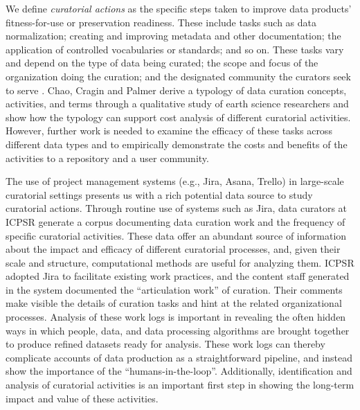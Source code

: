 \documentclass[conference]{IEEEtran}
\begin{document}
We define \textit{curatorial actions} as the specific steps taken to improve data products’ fitness-for-use or preservation readiness. These include tasks such as data normalization; creating and improving metadata and other documentation; the application of controlled vocabularies or standards; and so on. These tasks vary and depend on the type of data being curated; the scope and focus of the organization doing the curation; and the designated community the curators seek to serve \cite{Pienta2010-bl, Daniels2012-pj, Yakel2019-na}. Chao, Cragin and Palmer \cite{Chao2015-bq} derive a typology of data curation concepts, activities, and terms through a qualitative study of earth science researchers and show how the typology can support cost analysis of different curatorial activities. However, further work is needed to examine the efficacy of these tasks across different data types and to empirically demonstrate the costs and benefits of the activities to a repository and a user community.

The use of project management systems (e.g., Jira, Asana, Trello) in large-scale curatorial settings presents us with a rich potential data source to study curatorial actions. Through routine use of systems such as Jira, data curators at ICPSR generate a corpus documenting data curation work and the frequency of specific curatorial activities. These data offer an abundant source of information about the impact and efficacy of different curatorial processes, and, given their scale and structure, computational methods are useful for analyzing them. ICPSR adopted Jira to facilitate existing work practices, and the content staff generated in the system documented the “articulation work” \cite{Strauss1988-vy} of curation. Their comments make visible the details of curation tasks and hint at the related organizational processes. Analysis of these work logs is important in revealing the often hidden ways in which people, data, and data processing algorithms are brought together to produce refined datasets ready for analysis. These work logs can thereby complicate accounts of data production as a straightforward pipeline, and instead show the importance of the “humans-in-the-loop”. Additionally, identification and analysis of curatorial activities is an important first step in showing the long-term impact and value of these activities.
\end{document}
